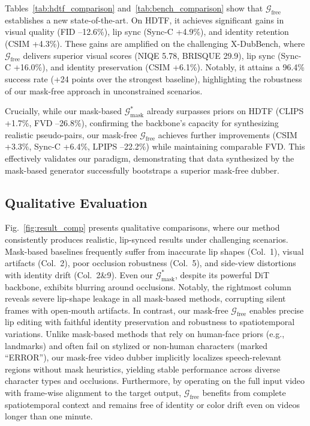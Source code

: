 \documentclass{article}
\newcommand{\benchname}{X-DubBench}
\newcommand{\Gmask}{\mathcal{G}_{\text{mask}}}
\newcommand{\Gfree}{\mathcal{G}_{\text{free}}}
\theoremstyle{plain}
\theoremstyle{definition}
\theoremstyle{remark}
\begin{document}
Tables~\ref{tab:hdtf_comparison} and~\ref{tab:bench_comparison} show that $\Gfree$ establishes a new state-of-the-art. On HDTF, it achieves significant gains in visual quality (FID –12.6\%), lip sync (Sync-C +4.9\%), and identity retention (CSIM +4.3\%). 
These gains are amplified on the challenging \benchname{}, where $\Gfree$ delivers superior visual scores (NIQE 5.78, BRISQUE 29.9), lip sync (Sync-C +16.0\%), and identity preservation (CSIM +6.1\%).
Notably, it attains a 96.4\% success rate (+24 points over the strongest baseline), highlighting the robustness of our mask-free approach in unconstrained scenarios.

Crucially, while our mask-based $\mathcal{G}_{\text{mask}}^*$ already surpasses priors on HDTF (CLIPS +1.7\%, FVD –26.8\%), confirming the backbone's capacity for synthesizing realistic pseudo-pairs, our mask-free $\mathcal{G}_{\text{free}}$ achieves further improvements (CSIM +3.3\%, Sync-C +6.4\%, LPIPS –22.2\%) while maintaining comparable FVD. 
This effectively validates our paradigm, demonstrating that data synthesized by the mask-based generator successfully bootstraps a superior mask-free dubber.





\subsection{Qualitative Evaluation}
Fig.~\ref{fig:result_comp} presents qualitative comparisons, where our method consistently produces realistic, lip-synced results under challenging scenarios.
Mask-based baselines frequently suffer from inaccurate lip shapes (Col.~1), visual artifacts (Col.~2), poor occlusion robustness (Col.~5), and side-view distortions with identity drift (Col.~2\&9).
Even our $\Gmask^*$, despite its powerful DiT backbone, exhibits blurring around occlusions.
Notably, the rightmost column reveals severe lip-shape leakage in all mask-based methods, corrupting silent frames with open-mouth artifacts.
In contrast, our mask-free $\Gfree$ enables precise lip editing with faithful identity preservation and robustness to spatiotemporal variations.
Unlike mask-based methods that rely on human-face priors (e.g., landmarks) and often fail on stylized or non-human characters (marked ``ERROR''), our mask-free video dubber implicitly localizes speech-relevant regions without mask heuristics, yielding stable performance across diverse character types and occlusions.
Furthermore, by operating on the full input video with frame-wise alignment to the target output, $\Gfree$ benefits from complete spatiotemporal context and remains free of identity or color drift even on videos longer than one minute.
\end{document}
